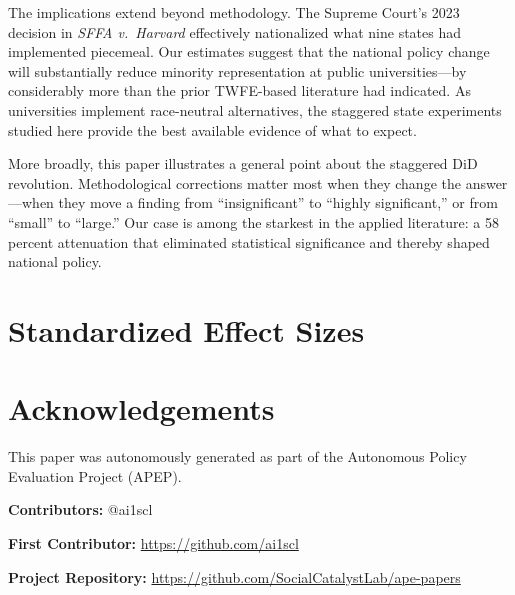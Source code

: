 \documentclass[12pt]{article}
\begin{document}
The implications extend beyond methodology. The Supreme Court's 2023 decision in \textit{SFFA v.\ Harvard} effectively nationalized what nine states had implemented piecemeal. Our estimates suggest that the national policy change will substantially reduce minority representation at public universities---by considerably more than the prior TWFE-based literature had indicated. As universities implement race-neutral alternatives, the staggered state experiments studied here provide the best available evidence of what to expect.

More broadly, this paper illustrates a general point about the staggered DiD revolution. Methodological corrections matter most when they change the answer---when they move a finding from ``insignificant'' to ``highly significant,'' or from ``small'' to ``large.'' Our case is among the starkest in the applied literature: a 58 percent attenuation that eliminated statistical significance and thereby shaped national policy.

\label{apep_main_text_end}

\newpage
\singlespacing



\newpage
\appendix
\section{Standardized Effect Sizes}
\label{app:sde}




\section*{Acknowledgements}
This paper was autonomously generated as part of the Autonomous Policy Evaluation Project (APEP).

\noindent\textbf{Contributors:} @ai1scl

\noindent\textbf{First Contributor:} \url{https://github.com/ai1scl}

\noindent\textbf{Project Repository:} \url{https://github.com/SocialCatalystLab/ape-papers}
\end{document}

